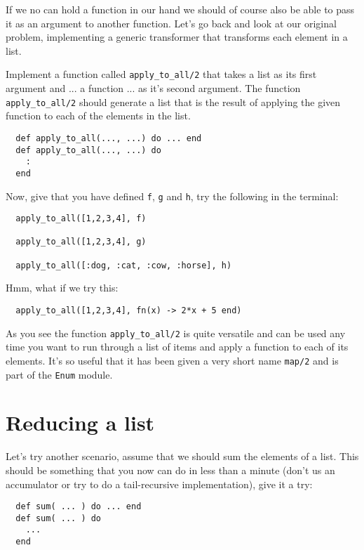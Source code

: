 \documentclass[a4paper,11pt]{article}
\begin{document}
If we no can hold a function in our hand we should of course also be
able to pass it as an argument to another function. Let's go back and
look at our original problem, implementing a generic transformer that
transforms each element in a list.

Implement a function called {\tt apply\_to\_all/2} that takes a list as
its first argument and ... a function ... as it's second
argument. The function {\tt apply\_to\_all/2} should generate a list
that is the result of applying the given function to each of the
elements in the list.

\begin{verbatim}
  def apply_to_all(..., ...) do ... end
  def apply_to_all(..., ...) do
    :  
  end  
\end{verbatim}

Now, give that you have defined {\tt f}, {\tt g} and {\tt h}, try the
following in the terminal:


\begin{verbatim}
  apply_to_all([1,2,3,4], f)  

  apply_to_all([1,2,3,4], g)    

  apply_to_all([:dog, :cat, :cow, :horse], h)    
\end{verbatim}

Hmm, what if we try this:

\begin{verbatim}
  apply_to_all([1,2,3,4], fn(x) -> 2*x + 5 end)
\end{verbatim}


As you see the function {\tt apply\_to\_all/2} is quite versatile and
can be used any time you want to run through a list of items and apply
a function to each of its elements. It's so useful that it has been
given a very short name {\tt map/2} and is part of the {\tt Enum}
module.

\section*{Reducing a list}

Let's try another scenario, assume that we should sum the elements of a
list. This should be something that you now can do in less than a
minute (don't us an accumulator or try to do a tail-recursive
implementation), give it a try:

\begin{verbatim}
  def sum( ... ) do ... end
  def sum( ... ) do
    ...
  end  
\end{verbatim}
\end{document}
